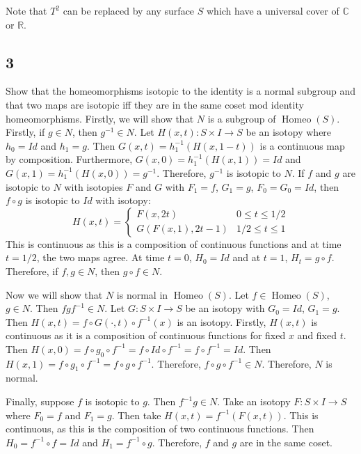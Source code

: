 \documentclass{article}
\theoremstyle{definition}
\numberwithin{theorem}{section}
\numberwithin{equation}{section}
\DeclareMathOperator{\Homeo}{Homeo}
\begin{document}
Note that $T^2$ can be replaced by any surface $S$ which have a universal cover of $\mathbb{C}$ or $\mathbb{R}$. 

\subsection{3}
Show that the homeomorphisms isotopic to the identity is a normal subgroup and that two maps are isotopic iff they are in the same coset mod identity homeomorphisms.
Firstly, we will show that $N$ is a subgroup of $\Homeo(S)$. Firstly, if $g \in N$, then $g^{-1} \in N$. Let $H(x, t) : S \times I \rightarrow S$ be an isotopy where $h_0 = Id$ and $h_1 = g$. Then $G(x, t) = h_1^{-1}(H(x, 1-t))$ is a continuous map by composition. Furthermore, $G(x, 0) = h_1^{-1}(H(x, 1)) = Id$ and $G(x, 1) = h_1^{-1}(H(x, 0)) = g^{-1}$. Therefore, $g^{-1}$ is isotopic to $N$. If $f$ and $g$ are isotopic to $N$ with isotopies $F$ and $G$ with $F_1 = f$, $G_1 = g$, $F_0 = G_0 = Id$, then $f \circ g$ is isotopic to $Id$ with isotopy:
\begin{equation*}
    H(x, t) =
    \begin{cases}
        F(x, 2t) & 0 \leq t \leq 1/2\\
        G(F(x, 1), 2t-1) & 1/2 \leq t \leq 1
    \end{cases}
\end{equation*}
This is continuous as this is a composition of continuous functions and at time $t = 1/2$, the two maps agree. At time $t = 0$, $H_0 = Id$ and at $t = 1$, $H_t = g \circ f$. Therefore, if $f, g \in N$, then $g \circ f \in N$. 

Now we will show that $N$ is normal in $\Homeo(S)$. 
Let $f \in \Homeo(S)$, $g \in N$. Then $f g f^{-1} \in N$. Let $G: S \times I \rightarrow S$ be an isotopy with $G_0 = Id$, $G_1 = g$. Then $H(x, t) = f \circ G(\cdot, t) \circ f^{-1} (x) $ is an isotopy. Firstly, $H(x, t)$ is continuous as it is a composition of continuous functions for fixed $x$ and fixed $t$. Then $H(x, 0) = f \circ g_0 \circ f^{-1} = f \circ Id \circ f^{-1} = f \circ f^{-1} = Id$. Then $H(x, 1) = f \circ g_1 \circ f^{-1} = f \circ g \circ f^{-1}$. Therefore, $f \circ g \circ f^{-1} \in N$. Therefore, $N$ is normal.

Finally, suppose $f$ is isotopic to $g$. Then $f^{-1} g \in N$. Take an isotopy $F : S \times I \rightarrow S$ where $F_0 = f$ and $F_1 = g$. Then take $H(x, t) = f^{-1}(F(x, t))$. This is continuous, as this is the composition of two continuous functions. Then $H_0 = f^{-1} \circ f = Id$ and $H_1 = f^{-1} \circ g$. Therefore, $f$ and $g$ are in the same coset. 
\end{document}
